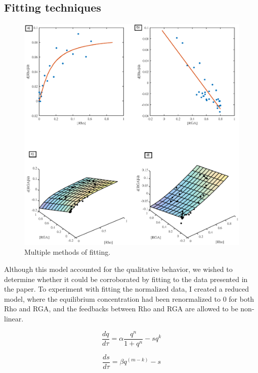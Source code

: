 \subsection{Fitting techniques}
\begin{figure}[h!]
	\centering
	\includegraphics[width=\hsize]{pulse/fitting_plot.eps}
	\caption{\label{fig:pulse_fit}  Multiple methods of fitting.}
\end{figure}

Although this model accounted for the qualitative behavior, we wished to determine whether it could be corroborated by fitting to the data presented in the paper. To experiment with fitting the normalized data, I created a reduced model, where the equilibrium concentration had been renormalized to 0 for both Rho and RGA, and the feedbacks between Rho and RGA are allowed to be non-linear.  

\begin{equation}
	\frac{dq}{d\tau} =\alpha \frac{q^n}{1 +q^n} - s q^k
\end{equation}

\begin{equation}
	\frac{ds}{d\tau} = \beta q^{(m-k)} - s
\end{equation}

